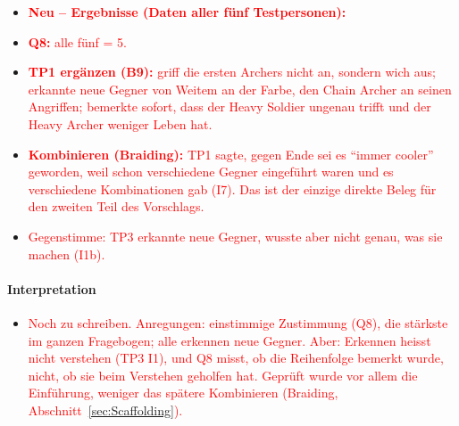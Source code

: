 \documentclass[../Main.tex]{subfiles}
\begin{document}
\begin{itemize}[leftmargin=1.5cm]
    \item \textcolor{red}{\textbf{Neu -- Ergebnisse (Daten aller fünf Testpersonen):}}
    \item \textcolor{red}{\textbf{Q8:} alle fünf = 5.}
    \item \textcolor{red}{\textbf{TP1 ergänzen (B9):} griff die ersten Archers nicht an, sondern wich aus; erkannte neue Gegner von Weitem an der Farbe, den Chain Archer an seinen Angriffen; bemerkte sofort, dass der Heavy Soldier ungenau trifft und der Heavy Archer weniger Leben hat.}
    \item \textcolor{red}{\textbf{Kombinieren (Braiding):} TP1 sagte, gegen Ende sei es \enquote{immer cooler} geworden, weil schon verschiedene Gegner eingeführt waren und es verschiedene Kombinationen gab (I7). Das ist der einzige direkte Beleg für den zweiten Teil des Vorschlags.}
    \item \textcolor{red}{Gegenstimme: TP3 erkannte neue Gegner, wusste aber nicht genau, was sie machen (I1b).}
\end{itemize}

\paragraph{Interpretation}
\begin{itemize}[leftmargin=1.5cm]
    \item \textcolor{red}{Noch zu schreiben. Anregungen: einstimmige Zustimmung (Q8), die stärkste im ganzen Fragebogen; alle erkennen neue Gegner. Aber: Erkennen heisst nicht verstehen (TP3 I1), und Q8 misst, ob die Reihenfolge bemerkt wurde, nicht, ob sie beim Verstehen geholfen hat. Geprüft wurde vor allem die Einführung, weniger das spätere Kombinieren (Braiding, Abschnitt~\ref{sec:Scaffolding}).}
\end{itemize}
\end{document}
